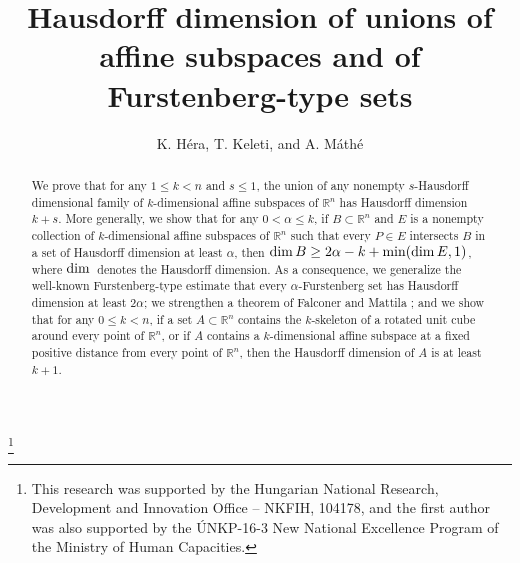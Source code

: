 \documentclass[a4paper]{amsart}
\theoremstyle{definition} \newtheorem{remark}[theorem]{Remark}
\def\rr{{\mathbb R}}
\def\R{{\mathbb R}}
\def\su{\subset}
\def\al{\alpha}
\def\dim{{\rm dim}\, }
\begin{document}
\title[Hausdorff dimension of unions of affine subspaces]{Hausdorff dimension of unions of affine subspaces and of Furstenberg-type sets}
\author{K. H\'era, T. Keleti, and A. M\'ath\'e}

\address
{Institute of Mathematics, E\"otv\"os Lor\'and University, 
P\'az\-m\'any P\'e\-ter s\'et\'any 1/c, H-1117 Budapest, Hungary}



\address
{Mathematics Institute, University of Warwick, Coventry, CV4 7AL, UK}



\thanks{This research was supported  
by the Hungarian National Research, Development and Innovation Office -- NKFIH, 104178, 
and the first author was also supported by the \'UNKP-16-3 New National Excellence Program of the Ministry of Human Capacities.} 

\begin{abstract}
We prove that for any $1 \leq k<n$ and $s\le 1$, the union of any nonempty 
$s$-Hausdorff dimensional family of $k$-dimensional affine subspaces 
of $\R^n$ has
Hausdorff dimension $k+s$.
More generally, we show that for any $0 < \al \leq k$, if $B \su \rr^n$ and $E$ is a nonempty collection 
of $k$-dimensional affine subspaces of $\R^n$ such that every
$P \in E$ intersects $B$ in a set of Hausdorff dimension at least $\al$, 
then 
$\dim B \ge 2 \al - k + \min(\dim E, 1)$, where $\dim$ denotes 
the Hausdorff dimension. 
As a consequence, we generalize the well-known Furstenberg-type estimate 
that every $\al$-Furstenberg set has Hausdorff dimension at least $2 \al$; we strengthen a theorem of Falconer and Mattila \cite{FaMa};
and we show that for any $0 \leq k<n$, if a set $A \su \rr^n$ contains the $k$-skeleton of a 
rotated unit cube around every point of $\rr^n$, 
or if $A$ contains a $k$-dimensional affine subspace at a fixed positive distance
from every point of $\R^n$, 
then the Hausdorff dimension of $A$ is at least $k + 1$. 
\end{abstract}

\maketitle
\end{document}
